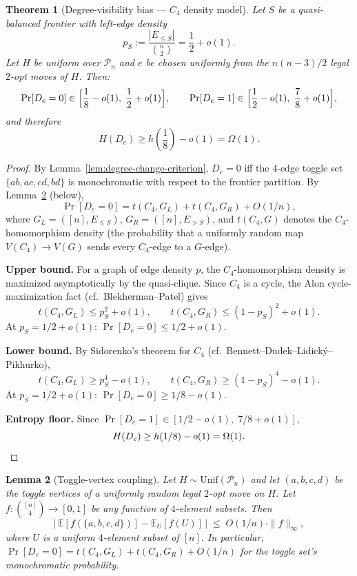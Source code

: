 \documentclass[11pt]{article}
\newtheorem{theorem}{Theorem}[section]
\newtheorem{lemma}[theorem]{Lemma}
\begin{document}
\begin{theorem}[Degree-visibility bias --- $C_4$ density model]
\label{thm:rerouting-relevance}
Let $S$ be a quasi-balanced frontier with left-edge density
\[
p_S := \frac{|E_{\le S}|}{\binom{n}{2}} = \frac{1}{2} + o(1).
\]
Let $H$ be uniform over $\mathcal{P}_n$ and $e$ be
chosen uniformly from the $n(n-3)/2$ legal $2$-opt moves
of $H$. Then:
\[
\Pr[D_e = 0] \in \Bigl[\frac{1}{8} - o(1),\;
\frac{1}{2} + o(1)\Bigr],
\qquad
\Pr[D_e = 1] \in \Bigl[\frac{1}{2} - o(1),\;
\frac{7}{8} + o(1)\Bigr],
\]
and therefore
\[
H(D_e) \ge h\!\left(\frac{1}{8}\right) - o(1) = \Omega(1).
\]
\end{theorem}

\begin{proof}
By Lemma~\ref{lem:degree-change-criterion}, $D_e = 0$
iff the $4$-edge toggle set $\{ab, ac, cd, bd\}$ is
monochromatic with respect to the frontier partition.
By Lemma~\ref{lem:toggle-coupling} (below),
\[
\Pr[D_e = 0] = t(C_4, G_L) + t(C_4, G_R) + O(1/n),
\]
where $G_L = ([n], E_{\le S})$, $G_R = ([n], E_{> S})$, and
$t(C_4, G)$ denotes the $C_4$-homomorphism density (the probability
that a uniformly random map $V(C_4) \to V(G)$ sends every
$C_4$-edge to a $G$-edge).

\textbf{Upper bound.}
For a graph of edge density $p$, the $C_4$-homomorphism
density is maximized asymptotically by the quasi-clique.
Since $C_4$ is a cycle, the Alon cycle-maximization fact
(cf.\ Blekherman--Patel) gives
\[
t(C_4, G_L) \le p_S^2 + o(1), \qquad
t(C_4, G_R) \le (1 - p_S)^2 + o(1).
\]
At $p_S = 1/2 + o(1)$:
$\Pr[D_e = 0] \le 1/2 + o(1)$.

\textbf{Lower bound.}
By Sidorenko's theorem for $C_4$
(cf.\ Bennett--Dudek--Lidick\'y--Pikhurko),
\[
t(C_4, G_L) \ge p_S^4 - o(1), \qquad
t(C_4, G_R) \ge (1 - p_S)^4 - o(1).
\]
At $p_S = 1/2 + o(1)$:
$\Pr[D_e = 0] \ge 1/8 - o(1)$.

\textbf{Entropy floor.}
Since $\Pr[D_e = 1] \in [1/2 - o(1),\; 7/8 + o(1)]$,
\[
H(D_e) \ge h(1/8) - o(1) = \Omega(1). \qedhere
\]
\end{proof}

\begin{lemma}[Toggle-vertex coupling]
\label{lem:toggle-coupling}
Let $H \sim \mathrm{Unif}(\mathcal{P}_n)$ and let $(a,b,c,d)$ be the
toggle vertices of a uniformly random legal $2$-opt move on $H$.  Let
$f : \binom{[n]}{4} \to [0,1]$ be any function of $4$-element subsets.
Then
\[
\bigl|\,\mathbb{E}[f(\{a,b,c,d\})]
- \mathbb{E}_{U}[f(U)]\,\bigr|
\;\le\; O(1/n) \cdot \|f\|_\infty,
\]
where $U$ is a uniform $4$-element subset of $[n]$.  In particular,
$\Pr[D_e = 0] = t(C_4, G_L) + t(C_4, G_R) + O(1/n)$
for the toggle set's monochromatic probability.
\end{lemma}
\end{document}
